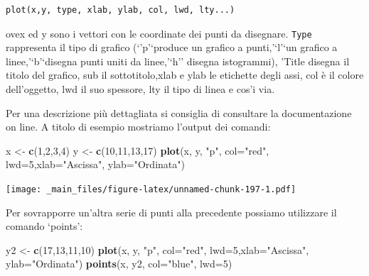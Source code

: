 \documentclass[a4paper,12pt,oneside]{book}
\newenvironment{Shaded}{\begin{snugshade}}{\end{snugshade}}
\newcommand{\KeywordTok}[1]{\textcolor[rgb]{0.13,0.29,0.53}{\textbf{#1}}}
\newcommand{\DataTypeTok}[1]{\textcolor[rgb]{0.13,0.29,0.53}{#1}}
\newcommand{\DecValTok}[1]{\textcolor[rgb]{0.00,0.00,0.81}{#1}}
\newcommand{\StringTok}[1]{\textcolor[rgb]{0.31,0.60,0.02}{#1}}
\newcommand{\NormalTok}[1]{#1}
\theoremstyle{definition}
\theoremstyle{definition}
\theoremstyle{definition}
\theoremstyle{remark}
\begin{document}
\begin{verbatim}
plot(x,y, type, xlab, ylab, col, lwd, lty...)
\end{verbatim}

ovex ed y sono i vettori con le coordinate dei punti da disegnare.
\texttt{Type} rappresenta il tipo di grafico (`'p'`produce un grafico a
punti,'`l'`un grafico a linee,'`b'`disegna punti uniti da linee,'`h''
disegna istogrammi), 'Title disegna il titolo del grafico, sub il
sottotitolo,xlab e ylab le etichette degli assi, col è il colore
dell'oggetto, lwd il suo spessore, lty il tipo di linea e cos'i via.

Per una descrizione più dettagliata si consiglia di consultare la
documentazione on line. A titolo di esempio mostriamo l'output dei
comandi:

\begin{Shaded}
\begin{Highlighting}[]
\NormalTok{x  <-}\StringTok{  }\KeywordTok{c}\NormalTok{(}\DecValTok{1}\NormalTok{,}\DecValTok{2}\NormalTok{,}\DecValTok{3}\NormalTok{,}\DecValTok{4}\NormalTok{)}
\NormalTok{y  <-}\StringTok{  }\KeywordTok{c}\NormalTok{(}\DecValTok{10}\NormalTok{,}\DecValTok{11}\NormalTok{,}\DecValTok{13}\NormalTok{,}\DecValTok{17}\NormalTok{)}
\KeywordTok{plot}\NormalTok{(x, y, }\StringTok{"p"}\NormalTok{, }\DataTypeTok{col=}\StringTok{"red"}\NormalTok{, }\DataTypeTok{lwd=}\DecValTok{5}\NormalTok{,}\DataTypeTok{xlab=}\StringTok{"Ascissa"}\NormalTok{, }\DataTypeTok{ylab=}\StringTok{"Ordinata"}\NormalTok{)}
\end{Highlighting}
\end{Shaded}

\texttt{[image: \_main\_files/figure-latex/unnamed-chunk-197-1.pdf]}

Per sovrapporre un'altra serie di punti alla precedente possiamo
utilizzare il comando `points':

\begin{Shaded}
\begin{Highlighting}[]
\NormalTok{y2  <-}\StringTok{  }\KeywordTok{c}\NormalTok{(}\DecValTok{17}\NormalTok{,}\DecValTok{13}\NormalTok{,}\DecValTok{11}\NormalTok{,}\DecValTok{10}\NormalTok{)}
\KeywordTok{plot}\NormalTok{(x, y, }\StringTok{"p"}\NormalTok{, }\DataTypeTok{col=}\StringTok{"red"}\NormalTok{, }\DataTypeTok{lwd=}\DecValTok{5}\NormalTok{,}\DataTypeTok{xlab=}\StringTok{"Ascissa"}\NormalTok{, }\DataTypeTok{ylab=}\StringTok{"Ordinata"}\NormalTok{)}
\KeywordTok{points}\NormalTok{(x, y2, }\DataTypeTok{col=}\StringTok{"blue"}\NormalTok{, }\DataTypeTok{lwd=}\DecValTok{5}\NormalTok{)}
\end{Highlighting}
\end{Shaded}
\end{document}
